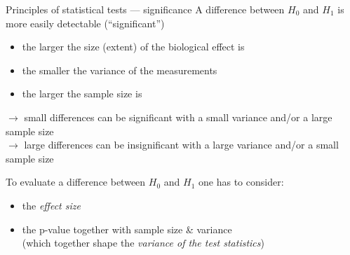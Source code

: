 \documentclass[
  ignorenonframetext,
  aspectratio=169,
  t]{beamer}
\providecommand{\tightlist}{%
  \setlength{\itemsep}{0pt}\setlength{\parskip}{0pt}}
\newcommand{\bluenorm}[1]{\textcolor{bluebeamer}{#1}}
\newcommand{\blueit}[1]{\textcolor{bluebeamer}{\emph{#1}}}
\begin{document}
\begin{frame}{Principles of statistical tests --- significance}
\protect{}\label{principles-of-statistical-tests-significance}
A difference between \(H_0\) and \(H_1\) is more easily detectable
(``significant'')

\begin{itemize}
\tightlist
\item
  the larger the size (extent) of the biological effect is
\item
  the smaller the variance of the measurements
\item
  the larger the sample size is
\end{itemize}

\pause

\(\rightarrow\) \bluenorm{small differences} can be
\bluenorm{significant} with a small variance and/or a large sample
size\\
\(\rightarrow\) \bluenorm{large differences} can be
\bluenorm{insignificant} with a large variance and/or a small sample
size

\pause

\vspace{0.5cm}

To evaluate a difference between \(H_0\) and \(H_1\) one has to
consider:

\begin{itemize}
\tightlist
\item
  the \blueit{effect size}
\item
  the p-value together with sample size \& variance\\
  (which together shape the \blueit{variance of the test statistics})
\end{itemize}
\end{frame}
\end{document}
